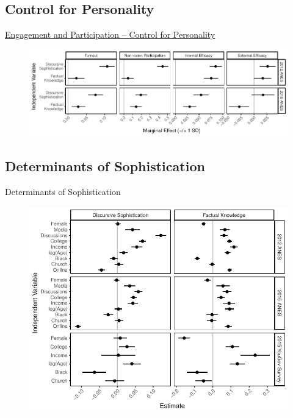 \subsection{Control for Personality}
\begin{frame}{\hyperlink{engagement}{Engagement and Participation -- Control for Personality}}\label{engagement_personality}
  \begin{figure}
  \includegraphics[width=\textwidth]{../fig/knoweff_personality.pdf}
  \end{figure}
\end{frame}

\subsection{Determinants of Sophistication}
\begin{frame}{Determinants of Sophistication}
\begin{figure}
	\includegraphics[height=.9\textheight]{../fig/determinants.pdf}
\end{figure}
\end{frame}

